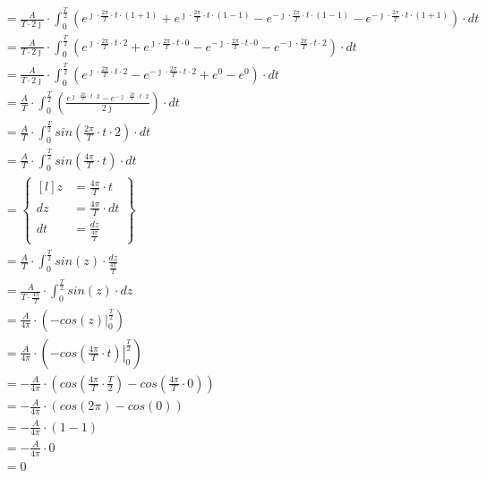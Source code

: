 \begin{align*}
&=\frac{A}{T\cdot 2\jmath} \cdot \int_{0}^{\frac{T}{2}}
\left(e^{\jmath \cdot \frac{2\pi}{T} \cdot t \cdot \left(1+1\right)} + e^{\jmath \cdot \frac{2\pi}{T} \cdot t \cdot \left(1 - 1\right)} - e^{-\jmath \cdot \frac{2\pi}{T} \cdot t \cdot \left(1 -1\right)} - e^{-\jmath \cdot \frac{2\pi}{T} \cdot t \cdot \left(1+1\right)} \right) \cdot dt\\
&=\frac{A}{T\cdot 2\jmath} \cdot \int_{0}^{\frac{T}{2}}
\left(e^{\jmath \cdot \frac{2\pi}{T} \cdot t \cdot 2} + e^{\jmath \cdot \frac{2\pi}{T} \cdot t \cdot 0} - e^{-\jmath \cdot \frac{2\pi}{T} \cdot t \cdot 0} - e^{-\jmath \cdot \frac{2\pi}{T} \cdot t \cdot 2} \right) \cdot dt\\
&=\frac{A}{T\cdot 2\jmath} \cdot \int_{0}^{\frac{T}{2}}
\left(e^{\jmath \cdot \frac{2\pi}{T} \cdot t \cdot 2} - e^{-\jmath \cdot \frac{2\pi}{T} \cdot t \cdot 2} + e^{0} - e^{0} \right) \cdot dt\\
&=\frac{A}{T} \cdot \int_{0}^{\frac{T}{2}}
\left( \frac{e^{\jmath \cdot \frac{2\pi}{T} \cdot t \cdot 2} - e^{-\jmath \cdot \frac{2\pi}{T} \cdot t \cdot 2}}{2\jmath} \right) \cdot dt\\
&=\frac{A}{T} \cdot \int_{0}^{\frac{T}{2}}
sin\left( \frac{2\pi}{T} \cdot t \cdot 2 \right) \cdot dt\\
&=\frac{A}{T} \cdot \int_{0}^{\frac{T}{2}}
sin\left( \frac{4\pi}{T} \cdot t \right) \cdot dt\\
&=\begin{Bmatrix*}[l]
z&=\frac{4\pi}{T} \cdot t\\
dz&=\frac{4\pi}{T} \cdot dt\\
dt&=\frac{dz}{\frac{4\pi}{T}}
\end{Bmatrix*}\\
&=\frac{A}{T} \cdot \int_{0}^{\frac{T}{2}} sin\left( z \right) \cdot \frac{dz}{\frac{4\pi}{T}}\\
&=\frac{A}{T\cdot \frac{4\pi}{T}} \cdot \int_{0}^{\frac{T}{2}} sin\left( z \right) \cdot dz\\
&=\frac{A}{4\pi} \cdot \left(\left. -cos\left( z \right) \right|_{0}^{\frac{T}{2}} \right)\\
&=\frac{A}{4\pi} \cdot \left(\left. -cos\left( \frac{4\pi}{T} \cdot t \right) \right|_{0}^{\frac{T}{2}} \right)\\
&=-\frac{A}{4\pi} \cdot \left(cos\left( \frac{4\pi}{T} \cdot \frac{T}{2} \right) -cos\left( \frac{4\pi}{T} \cdot 0 \right) \right)\\
&=-\frac{A}{4\pi} \cdot \left(cos\left( 2\pi \right) -cos\left( 0 \right) \right)\\
&=-\frac{A}{4\pi} \cdot \left(1 -1 \right)\\
&=-\frac{A}{4\pi} \cdot 0\\
&=0
\end{align*}

